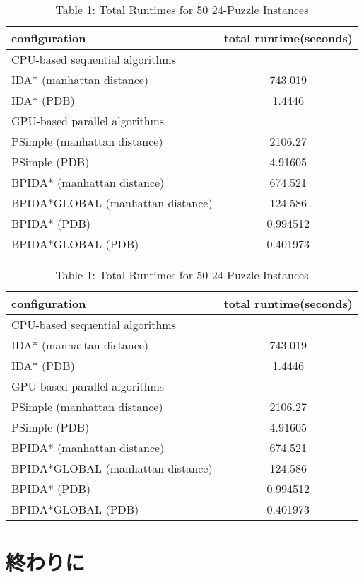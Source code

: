 \documentclass[a4paper,11pt,oneside,openany]{jsbook}
\begin{document}
\begin{table}[]
\centering
\caption{Table 1: Total Runtimes for 50 24-Puzzle Instances}
\label{my-label}
\begin{tabular}{|l|c|}
\hline
configuration & \multicolumn{1}{l|}{total runtime(seconds)} \\ \hline
\multicolumn{2}{|l|}{CPU-based sequential algorithms} \\ \hline
IDA* (manhattan distance) & 743.019 \\
IDA* (PDB) & 1.4446 \\ \hline
\multicolumn{2}{|l|}{GPU-based parallel algorithms} \\ \hline
PSimple (manhattan distance) & 2106.27 \\
PSimple (PDB) & 4.91605 \\
BPIDA* (manhattan distance) & 674.521 \\
BPIDA*GLOBAL (manhattan distance) & 124.586 \\
BPIDA* (PDB) & 0.994512 \\
BPIDA*GLOBAL (PDB) & 0.401973 \\ \hline
\end{tabular}
\end{table}

\begin{table}[]
\centering
\caption{Table 1: Total Runtimes for 50 24-Puzzle Instances}
\label{my-label}
\begin{tabular}{|l|c|}
\hline
configuration & \multicolumn{1}{l|}{total runtime(seconds)} \\ \hline
\multicolumn{2}{|l|}{CPU-based sequential algorithms} \\ \hline
IDA* (manhattan distance) & 743.019 \\
IDA* (PDB) & 1.4446 \\ \hline
\multicolumn{2}{|l|}{GPU-based parallel algorithms} \\ \hline
PSimple (manhattan distance) & 2106.27 \\
PSimple (PDB) & 4.91605 \\
BPIDA* (manhattan distance) & 674.521 \\
BPIDA*GLOBAL (manhattan distance) & 124.586 \\
BPIDA* (PDB) & 0.994512 \\
BPIDA*GLOBAL (PDB) & 0.401973 \\ \hline
\end{tabular}
\end{table}

\chapter{終わりに}
\end{document}
